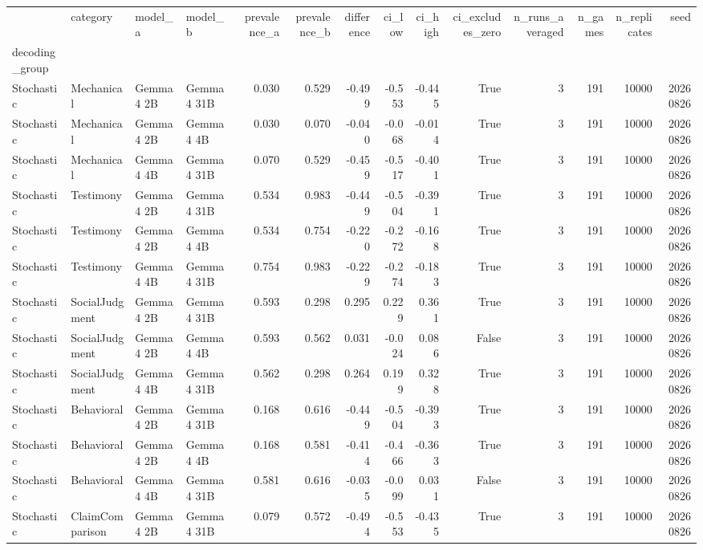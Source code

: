 \begin{tabular}{llllrrrrrrrrrr}
\toprule
 & category & model\_a & model\_b & prevalence\_a & prevalence\_b & difference & ci\_low & ci\_high & ci\_excludes\_zero & n\_runs\_averaged & n\_games & n\_replicates & seed \\
decoding_group &  &  &  &  &  &  &  &  &  &  &  &  &  \\
\midrule
Stochastic & Mechanical & Gemma 4 2B & Gemma 4 31B & 0.030 & 0.529 & -0.499 & -0.553 & -0.445 & True & 3 & 191 & 10000 & 20260826 \\
Stochastic & Mechanical & Gemma 4 2B & Gemma 4 4B & 0.030 & 0.070 & -0.040 & -0.068 & -0.014 & True & 3 & 191 & 10000 & 20260826 \\
Stochastic & Mechanical & Gemma 4 4B & Gemma 4 31B & 0.070 & 0.529 & -0.459 & -0.517 & -0.401 & True & 3 & 191 & 10000 & 20260826 \\
Stochastic & Testimony & Gemma 4 2B & Gemma 4 31B & 0.534 & 0.983 & -0.449 & -0.504 & -0.391 & True & 3 & 191 & 10000 & 20260826 \\
Stochastic & Testimony & Gemma 4 2B & Gemma 4 4B & 0.534 & 0.754 & -0.220 & -0.272 & -0.168 & True & 3 & 191 & 10000 & 20260826 \\
Stochastic & Testimony & Gemma 4 4B & Gemma 4 31B & 0.754 & 0.983 & -0.229 & -0.274 & -0.183 & True & 3 & 191 & 10000 & 20260826 \\
Stochastic & SocialJudgment & Gemma 4 2B & Gemma 4 31B & 0.593 & 0.298 & 0.295 & 0.229 & 0.361 & True & 3 & 191 & 10000 & 20260826 \\
Stochastic & SocialJudgment & Gemma 4 2B & Gemma 4 4B & 0.593 & 0.562 & 0.031 & -0.024 & 0.086 & False & 3 & 191 & 10000 & 20260826 \\
Stochastic & SocialJudgment & Gemma 4 4B & Gemma 4 31B & 0.562 & 0.298 & 0.264 & 0.199 & 0.328 & True & 3 & 191 & 10000 & 20260826 \\
Stochastic & Behavioral & Gemma 4 2B & Gemma 4 31B & 0.168 & 0.616 & -0.449 & -0.504 & -0.393 & True & 3 & 191 & 10000 & 20260826 \\
Stochastic & Behavioral & Gemma 4 2B & Gemma 4 4B & 0.168 & 0.581 & -0.414 & -0.466 & -0.363 & True & 3 & 191 & 10000 & 20260826 \\
Stochastic & Behavioral & Gemma 4 4B & Gemma 4 31B & 0.581 & 0.616 & -0.035 & -0.099 & 0.031 & False & 3 & 191 & 10000 & 20260826 \\
Stochastic & ClaimComparison & Gemma 4 2B & Gemma 4 31B & 0.079 & 0.572 & -0.494 & -0.553 & -0.435 & True & 3 & 191 & 10000 & 20260826 \\

\end{tabular}
